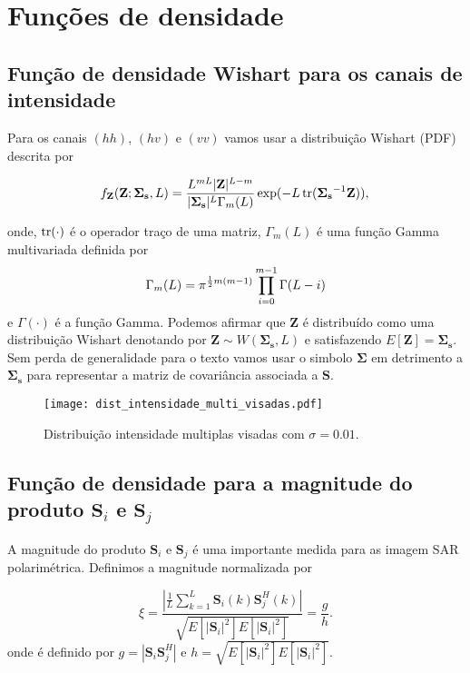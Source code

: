 \section{Funções de densidade}
\subsection{Função de densidade Wishart para os canais de intensidade}
Para os canais $(hh)$, $(hv)$ e $(vv)$ vamos usar a distribuição Wishart (PDF) descrita por

\begin{equation}
    f_{\mathbf{Z}}(\mathbf{Z};\mathbf{\Sigma_{s}},L)=\frac{L^{mL}|\mathbf{Z}|^{L-m}}{|\mathbf{\Sigma_{s}}|^{L}\Gamma_m(L)} \exp(-L\operatorname{tr}(\mathbf{\Sigma_{s}}^{-1}\mathbf{Z})), \\
\end{equation} 

onde, $\operatorname{tr}(\cdot)$ é o operador traço de uma matriz, $\Gamma_m(L)$ é uma função Gamma multivariada definida por
\begin{equation}\label{cap_acf_10}
	\Gamma_m(L)=\pi^{\frac{1}{2}m(m-1)} \prod_{i=0}^{m-1}\Gamma(L-i) \\
\end{equation}
e $\Gamma(\cdot)$ é a função Gamma. Podemos afirmar que $\mathbf{Z}$ é distribuído como uma distribuição Wishart denotando por $\mathbf{Z}\sim W(\mathbf{\Sigma_{s}}, L)$ e satisfazendo $E[\mathbf{Z}]=\mathbf{\Sigma_{s}}$. Sem perda de generalidade para o texto vamos usar o simbolo $\mathbf{\Sigma}$ em detrimento a $\mathbf{\Sigma_{s}}$ para representar a matriz de covariância associada a $\mathbf{S}$.

\begin{figure}[hbt]
\centering
\texttt{[image: dist\_intensidade\_multi\_visadas.pdf]}
	\caption{Distribuição intensidade multiplas visadas com $\sigma=0.01$.}
\label{fig2}
\end{figure}


\subsection{Função de densidade para a magnitude do produto $\mathbf{S}_i$ e $\mathbf{S}_j$}
A magnitude do produto $\mathbf{S}_i$ e $\mathbf{S}_j$ é uma importante medida para as imagem SAR polarimétrica. Definimos a magnitude normalizada por 

\begin{equation}
	\xi = \frac{\left|\frac{1}{L} \sum_{k=1}^L\mathbf{S}_i(k)\mathbf{S}_j^H(k) \right|}{\sqrt{E[|\mathbf{S}_i|^2]E[|\mathbf{S}_i|^2]}}=\frac{g}{h}.
\end{equation}
onde é definido por $g=|\mathbf{S}_i\mathbf{S}_j^H|$ e $h=\sqrt{E[|\mathbf{S}_i|^2]E[|\mathbf{S}_i|^2]}$.

